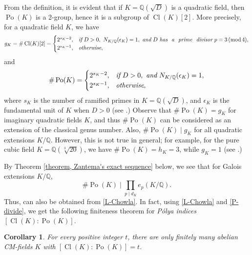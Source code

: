 \documentclass[12pt]{amsart}
\newtheorem{corollary}[theorem]{Corollary}
\theoremstyle{definition}
\numberwithin{equation}{section}
\DeclareMathOperator{\Po}{Po}
\DeclareMathOperator{\Cl}{Cl}
\begin{document}
From the definition, it is evident that if $K=\mathbb{Q}(\sqrt{D})$ is a quadratic field, then $\Po(K)$ is a 2-group, hence it is a subgroup of $\Cl(K)[2]$. More precisely, for a quadratic field $K$, we have 
\begin{equation} \label{gK quadratic}
g_K=\#\Cl(K)[2]= \begin{cases}
2^{s_K-2},&{{\rm \textit{if}}~D>0,~N_{K/\mathbb{Q}}(\epsilon_K)=1,~{\rm \textit{and}}~D~{\rm \textit{has~ a~ prime ~divisor}}~p \equiv 3 \, (\mathrm{mod}\, 4),}\\
2^{s_K-1},&{{\rm \textit{otherwise}},}
\end{cases}
\end{equation}
and
\begin{equation}
\label{Hilbert}
\#\Po(K)=\begin{cases}
2^{s_K-2},&{{\rm \textit{if}}~D>0,~{\rm \textit{and}}~N_{K/\mathbb{Q}}(\epsilon_K)=1,}\\
2^{s_K-1},&{{\rm \textit{otherwise}},}
\end{cases} 
\end{equation}
where $s_K$ is the number of ramified primes in $K=\mathbb{Q} (\sqrt{D})$, and $\epsilon_K$ is the fundamental unit of $K$ when $D>0$ (see \cite[Corollary 9.8 and Theorem 9.10]{Lemmermeyer}.) Observe that $\#\Po(K)=g_K$ for imaginary quadratic fields $K$, and thus $\#\Po(K)$ can be considered as an extension of the classical genus number.
Also, $\#\Po(K)\mid g_K$ for all quadratic extensions $K/\mathbb{Q}$. However,  this is not true in general; for example, for the pure cubic field $K=\mathbb{Q}(\sqrt[3]{20})$, we have $\# \Po(K)=h_K=3$, while $g_K=1$ (see \cite[Example 3.10 ]{Leriche 2014}.)



By Theorem \ref{theorem, Zantema's exact sequence} below, we see that for Galois extensions $K/\mathbb{Q}$,
\begin{equation} 
\label{P-divide}
\# \Po(K) \mid {\prod_{p \mid d_K} e_{p}(K/\mathbb{Q})}.
\end{equation}
Thus, 
 \cite[Corollary 3.15]{Emmelin} can also be obtained from \eqref{L-Chowla}. In fact, using \eqref{L-Chowla} and \eqref{P-divide}, we  get the following finiteness theorem for \textit{P\'olya indices} $\left[\Cl(K):\Po(K)\right]$. 
\begin{corollary}
	For every positive integer $t$, there are only finitely many abelian CM-fields $K$ with $\left[\Cl(K): \Po(K)\right]=t$.
\end{corollary}
\end{document}
